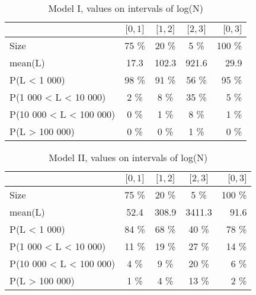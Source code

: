 \documentclass[numbered]{CSL}
\begin{document}
\setlength{\tabcolsep}{0.5em}
\begin{table}
\centering
\caption{Model I, values on intervals of log(N) \label{table:NModelI}}
\begin{tabular}{l|ccc|r}
\toprule
{} & \small{$\lbrack 0, 1 \rbrack$} & \small{$\lbrack 1, 2 \rbrack$} & \small{$\lbrack 2, 3 \rbrack$} & \small{$\lbrack 0, 3 \rbrack$} \\
\midrule
Size                    &               75 \% &               20 \% &                5 \% &              100 \% \\
mean(L)                 &               17.3 &              102.3 &              921.6 &               29.9 \\
P(L < 1 000)            &               98 \% &               91 \% &               56 \% &               95 \% \\
P(1 000 < L < 10 000)   &                2 \% &                8 \% &               35 \% &                5 \% \\
P(10 000 < L < 100 000) &                0 \% &                1 \% &                8 \% &                1 \% \\
P(L > 100 000)          &                0 \% &                0 \% &                1 \% &                0 \% \\
\bottomrule
\end{tabular}
\end{table}

\setlength{\tabcolsep}{0.5em}
\begin{table}
\centering
\caption{Model II, values on intervals of log(N) \label{table:NModelII}}
\begin{tabular}{l|ccc|r}
\toprule
{} & \small{$\lbrack 0, 1 \rbrack$} & \small{$\lbrack 1, 2 \rbrack$} & \small{$\lbrack 2, 3 \rbrack$} & \small{$\lbrack 0, 3 \rbrack$} \\
\midrule
Size                    &               75 \% &               20 \% &                5 \% &              100 \% \\
mean(L)                 &               52.4 &              308.9 &             3411.3 &               91.6 \\
P(L < 1 000)            &               84 \% &               68 \% &               40 \% &               78 \% \\
P(1 000 < L < 10 000)   &               11 \% &               19 \% &               27 \% &               14 \% \\
P(10 000 < L < 100 000) &                4 \% &                9 \% &               20 \% &                6 \% \\
P(L > 100 000)          &                1 \% &                4 \% &               13 \% &                2 \% \\
\bottomrule
\end{tabular}
\end{table}
\end{document}
